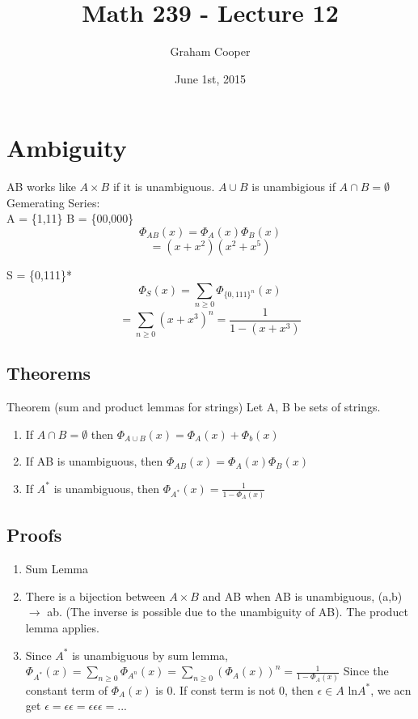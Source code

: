 \documentclass[12pt]{article}
\title{\vspace{-15ex}Math 239 - Lecture 12\vspace{-1ex}}
\date{June 1st, 2015}
\author{Graham Cooper}
\begin{document}
	\maketitle
	
	\section*{Ambiguity}
	
	AB works like $A \times B$ if it is unambiguous. $A \cup B$ is unambigious if $A \cap B = \emptyset$\\
	
	Gemerating Series: \\
	A = \{1,11\} B = \{00,000\}\\
	$$\Phi_{AB}(x) = \Phi_A(x)\Phi_B(x)$$
	$$= (x +x^2)(x^2 + x^5)$$
	
	S = \{0,111\}*\\
	
	$$\Phi_S(x) = \sum_{n \geq 0}\Phi_{\{0,111\}^n}(x)$$
	$$ = \sum_{n \geq 0}(x + x^3)^n = \frac{1}{1-(x+x^3)}$$
	
	\subsection*{Theorems}
	Theorem (sum and product lemmas for strings) Let A, B be sets of strings.\\
	
	\begin{enumerate}
		\item If $A \cap B = \emptyset$ then $\Phi_{A\cup B}(x) = \Phi_{A}(x) + \Phi_{b}(x)$
		\item If AB is unambiguous, then $\Phi_{AB}(x) = \Phi_A(x)\Phi_B(x)$
		\item If $A^*$ is unambiguous, then $\Phi_{A^*}(x) = \frac{1}{1-\Phi_A(x)}$
	\end{enumerate}
	
	\subsection*{Proofs}
	\begin{enumerate}
		\item Sum Lemma
		\item There is a bijection between $A \times B$ and AB when AB is unambiguous, (a,b) $\rightarrow$ ab. (The inverse is possible due to the unambiguity of AB). The product lemma applies.
		\item Since $A^*$ is unambiguous by sum lemma, $\Phi_{A^*}(x) = \sum_{n \geq 0}\Phi_{A^n}(x) = \sum_{n \geq 0}(\Phi_A(x))^n = \frac{1}{1 - \Phi_A(x)}$ Since the constant term of $\Phi_A(x)$ is 0. If const term is not 0, then $\epsilon \in A$ ln$A^*$, we acn get $\epsilon = \epsilon\epsilon = \epsilon\epsilon\epsilon = ...$
	\end{enumerate}
	
\end{document}
